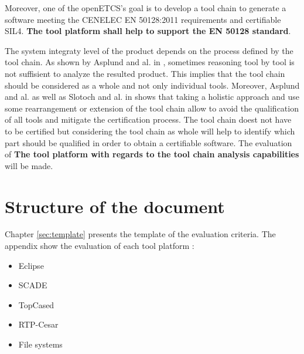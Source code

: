 Moreover, one of the openETCS's goal is to develop a tool chain to
generate a software meeting the CENELEC EN 50128:2011 requirements and
certifiable \gls{SIL}4. {\bf The tool platform shall help to support the EN 50128
standard}. 

The system integraty level of the product depends on the process
defined by the tool chain. As shown by Asplund and al. in
\cite{asplund_qualifying_2012}, sometimes reasoning tool by tool is
not suffisient to analyze the resulted product.  This implies that the
tool chain should be considered as a whole and not only individual
tools. Moreover, Asplund and al. as well as Slotoch and al. in
\cite{slotosch_iso_2012} shows that taking a holistic approach and use
some rearrangement or extension of the tool chain allow to avoid the
qualification of all tools and mitigate the certification process.
The tool chain doest not have to be certified but considering the tool
chain as whole will help to identify which part should be qualified in
order to obtain a certifiable software.  The evaluation of {\bf The
  tool platform with regards to the tool chain analysis capabilities}
will be made.


\section{Structure of the document}

Chapter \ref{sec:template} presents the template of the evaluation
criteria.
The appendix show the evaluation of each tool platform :
\begin{itemize}
\item Eclipse
\item SCADE
\item TopCased
\item RTP-Cesar
\item File systems
\end{itemize}

\printglossary


